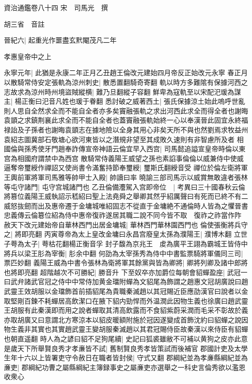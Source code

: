 資治通鑑卷八十四
宋　司馬光　撰

胡三省　音註

晉紀六|{
	起重光作噩盡玄黓閹茂凡二年}


孝惠皇帝中之上

永寧元年|{
	此猶是永康二年正月乙丑趙王倫改元建始四月帝反正始改元永寧}
春正月以散騎常侍安定張軌為涼州刺史|{
	散悉置翻騎奇寄翻}
軌以時方多難隂有保據河西之志故求為涼州時州境盜賊縱横|{
	難乃旦翻縱子容翻}
鮮卑為寇軌至以宋配汜瑗為謀主|{
	楊正衡曰汜音凡姓也瑗于眷翻}
悉討破之威著西土|{
	張氏保據涼土始此嗚呼世亂則人思自全然求全而不能自全者亦多矣竇融張軌之求出河西此求全而得全者也謝晦袁顗之求鎮荆襄此求全而不能自全者也蓋竇融張軌始終一心以奉漢晉此固宜永終福禄詒及子孫者也謝晦袁顗志在據地險以全身其用心非矣天所不與也然劉焉求牧益州袁紹志圖冀部石敬塘心欲河東皆以之潛規非望至其成敗久速則有非智慮所及者}
相國倫與孫秀使牙門趙奉詐傳宣帝神語云倫宜早入西宫|{
	司馬懿追謚宣皇帝時倫以東宫為相國府謂禁中為西宫}
散騎常侍義陽王威望之孫也素諂事倫倫以威兼侍中使威逼奪帝璽綬作禪詔又使尚書令滿奮持節奉璽綬|{
	璽斯氏翻綬音受}
禪位於倫左衛將軍王輿前軍將軍司馬雅等帥甲士入殿|{
	帥讀曰率}
曉諭三部司馬示以威賞無敢違者張林等屯守諸門|{
	屯守宫城諸門也}
乙丑倫備灋駕入宫即帝位　|{
	考異曰三十國春秋云倫將篡位義陽王威執詔示嵇紹曰聖上法堯舜之舉卿其然乎紹厲聲曰有死而已終不有二威怒抜劒而出及惠帝遷于金墉城唯紹固志不從直于金墉絶不通倫時人皆為之懼晉書忠義傳云倫簒位紹為侍中惠帝復祚遂居其職二說不同今皆不取　復祚之祚當作阼}
赦天下改元建始帝自華林西門出居金墉城|{
	華林西門華林園西門也}
倫使張衡將兵守之|{
	將即亮翻}
丙寅尊帝為太上皇改金墉曰永昌宫廢皇太孫為濮陽王|{
	濮博木翻}
立世子荂為太子|{
	荂枯花翻楊正衡音孚}
封子馥為京兆王　䖍為廣平王詡為霸城王皆侍中將兵以梁王肜為宰衡|{
	肜余中翻}
何劭為太宰孫秀為侍中中書監票騎將軍儀同三司|{
	票匹妙翻}
義陽王威為中書令張林為衛將軍其餘黨與皆為卿將|{
	卿將列卿及諸中郎將也將即亮翻}
超階越次不可勝紀|{
	勝音升}
下至奴卒亦加爵位每朝會貂蟬盈座|{
	武冠一曰武弁諸武官冠之侍中中常侍加黄金璫附蟬為文貂尾為飾謂之趙惠文冠胡廣說曰趙武靈王效胡服以金璫飾首前插貂尾為貴職秦滅趙以其冠賜近臣應劭漢官曰說者以金取堅剛百鍊不耗蟬居高飲潔口在腋下貂内勁悍而外温潤此因物生義也徐廣曰趙武靈王胡服有此秦漢即而用之說者蟬取其清高飲露而不食貂紫蔚采潤而毛采不彰故於義亦取胡廣又曰意謂北方寒涼本以貂皮暖額附施於冠因遂變成首飾沈約曰貂蟬之說因物生義非其實也其實趙武靈王變胡服秦滅趙以其君冠賜侍臣故秦漢以來侍臣有貂蟬也朝直遥翻}
時人為之諺曰貂不足狗尾續|{
	史記曰狐裘雖敝不可補以黄狗之皮亦此意}
是歲天下所舉賢良秀才孝亷皆不試|{
	舊制賢良秀孝皆策試而後補官}
郡國計吏及太學生年十六以上皆署吏守令赦日在職者皆封侯|{
	守式又翻}
郡綱紀並為孝亷縣綱紀並為亷吏|{
	郡綱紀功曹之屬縣綱紀主簿録事史之屬亷吏亦選舉之一科史言倫秀欲以濫恩收衆心}
